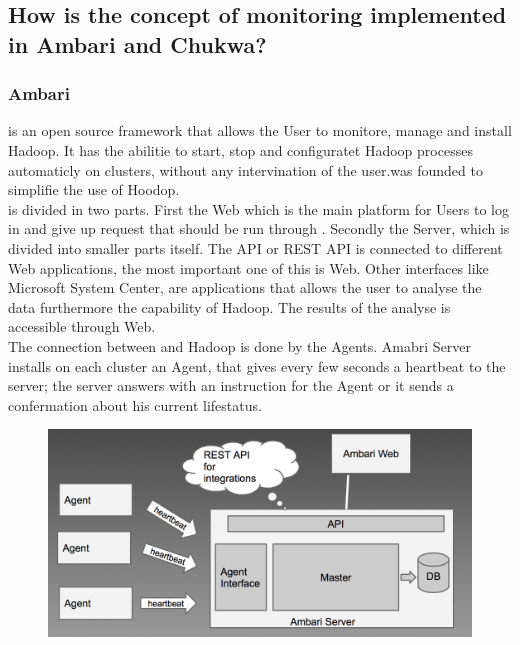 \subsection{How is the concept of monitoring implemented in Ambari and Chukwa?}
\label{subsec:Implementation}

\subsubsection{Ambari}
\amb is an open source framework that allows the User to monitore, manage and install Hadoop. It has the abilitie to start, stop and configuratet Hadoop processes automaticly on clusters, without any intervination of the user.\amb was founded to simplifie the use of Hoodop. \cite{Sako2013}
\\
\amb is divided in two parts. First the \amb Web which is the main platform for Users to log in and give up request that should be run through \amb. Secondly the \amb Server, which is divided into smaller parts itself. The API or REST API is connected to different Web applications, the most important one of this is \amb Web. Other interfaces like Microsoft System Center, are applications that allows the user to analyse the data furthermore the capability of Hadoop. The results of the analyse is accessible through \amb Web.
\\
The connection between \amb and Hadoop is done by the \amb Agents. Amabri Server installs on each cluster an \amb Agent, that gives every few seconds a heartbeat to the server; the server answers with an instruction for the Agent or it sends a confermation about his current lifestatus. 
\\
\begin{figure}
\centering
\includegraphics[width=0.7\linewidth]{images/Bild}
\caption{}
\label{fig:Bild}
\end{figure}

